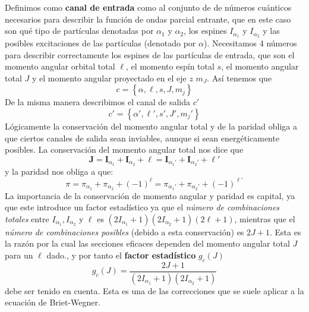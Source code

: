 \documentclass[fleqn,11pt]{SelfArx} %
\newcommand{\In}{\mathbf{I}}
\newcommand{\Jn}{\mathbf{J}}
\begin{document}
Definimos como \textbf{canal de entrada} como al conjunto de de números cuánticos necesarios para describir la función de ondas parcial entrante, que en este caso son qué tipo de partículas denotadas por  $\alpha_1$ y $\alpha_2$, los espines $I_{\alpha_1}$ y $I_{\alpha_2}$ y las posibles excitaciones de las partículas (denotado por $\alpha$). Necesitamos 4 números para describir correctamente los espines de las partículas de entrada, que son el momento angular orbital total $\ell$, el momento espín total $s$, el momento angular total $J$ y el momento angular proyectado en el eje $z$ $m_J$. Así tenemos que
\begin{equation}
	c = \left\lbrace \alpha,\ell,s,J,m_j \right\rbrace
\end{equation}
De la misma manera describimos el canal de salida $c'$
\begin{equation}
	c' = \left\lbrace \alpha',\ell',s',J',m_j' \right\rbrace
\end{equation}
Lógicamente la conservación del momento angular total y de la paridad obliga a que ciertos canales de salida sean inviables, aunque si sean energéticamente posibles. La conservación del momento angular total nos dice que
\begin{equation}
	\Jn = \In_{\alpha_1}+\In_{\alpha_2}+\ell =  \In_{\alpha_1'}+\In_{\alpha_2'}+\ell' 
\end{equation}
y la paridad nos obliga a que:
\begin{equation}
	\pi = \pi_{\alpha_1}+\pi_{\alpha_2}+(-1)^{\ell} =  \pi_{\alpha_1'}+ \pi_{\alpha_2'} +(-1)^{\ell'} 
\end{equation}
La importancia de la conservación de momento angular y paridad es capital, ya que este introduce un factor estadístico ya que el \textit{número de combinaciones totales} entre $I_{\alpha_1}, I_{\alpha_2}$ y $\ell$ es $(2I_{\alpha_1}+1)(2I_{\alpha_2}+1)(2\ell+1)$, mientras que el \textit{número de combinaciones posibles} (debido a esta conservación) es $2J+1$. Esta es la razón por la cual las secciones eficaces dependen del momento angular total $J$ para un $\ell$ dado., y por tanto el \textbf{factor estadístico} $g_c(J)$
\begin{equation}
	g_c(J)=\frac{2J+1}{(2I_{\alpha_1}+1)(2I_{\alpha_2}+1)}
\end{equation}
debe ser tenido en cuenta. Esta es una de las correcciones que se suele aplicar a la ecuación de Briet-Wegner.

\end{document}
